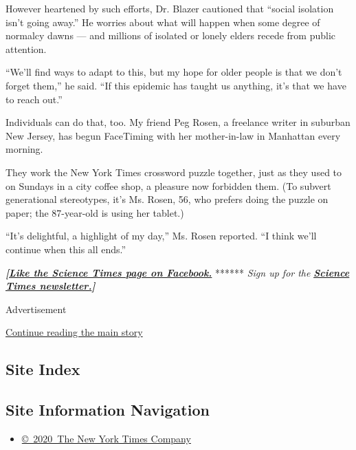 However heartened by such efforts, Dr. Blazer cautioned that ``social
isolation isn't going away.'' He worries about what will happen when
some degree of normalcy dawns --- and millions of isolated or lonely
elders recede from public attention.

``We'll find ways to adapt to this, but my hope for older people is that
we don't forget them,'' he said. ``If this epidemic has taught us
anything, it's that we have to reach out.''

Individuals can do that, too. My friend Peg Rosen, a freelance writer in
suburban New Jersey, has begun FaceTiming with her mother-in-law in
Manhattan every morning.

They work the New York Times crossword puzzle together, just as they
used to on Sundays in a city coffee shop, a pleasure now forbidden them.
(To subvert generational stereotypes, it's Ms. Rosen, 56, who prefers
doing the puzzle on paper; the 87-year-old is using her tablet.)

``It's delightful, a highlight of my day,'' Ms. Rosen reported. ``I
think we'll continue when this all ends.''

\textbf{\emph{{[}}\href{http://on.fb.me/1paTQ1h}{\emph{Like the Science
Times page on Facebook.}}} ****** \emph{\textbar{} Sign up for the}
\textbf{\href{http://nyti.ms/1MbHaRU}{\emph{Science Times
newsletter.}}\emph{{]}}}

Advertisement

\protect\hyperlink{after-bottom}{Continue reading the main story}

\hypertarget{site-index}{%
\subsection{Site Index}\label{site-index}}

\hypertarget{site-information-navigation}{%
\subsection{Site Information
Navigation}\label{site-information-navigation}}

\begin{itemize}
\tightlist
\item
  \href{https://help.nytimes3xbfgragh.onion/hc/en-us/articles/115014792127-Copyright-notice}{©~2020~The
  New York Times Company}
\end{itemize}

